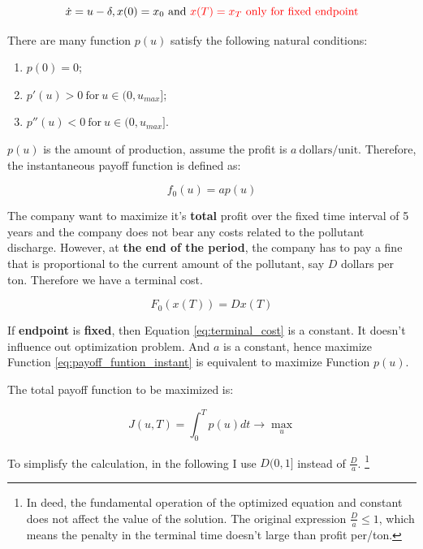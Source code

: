 \documentclass{article}
\begin{document}
\begin{equation}\label{cd:initial_condition}
    \dot{x}=u-\delta, x(0)=x_0\ \text{and}\ {\color{red} x(T)=x_T\ \text{only for fixed endpoint}}
\end{equation}

There are many function $p(u)$ satisfy the following natural conditions:

\begin{enumerate}
    \item $p(0)=0$;
    \item $p'(u)>0\ \text{for}\ u\in(0,u_{max}]$;
    \item $p''(u)<0\ \text{for}\ u\in(0,u_{max}]$.
\end{enumerate}

$p(u)$ is the amount of production, assume the profit is $a\ \text{dollars/unit}$. Therefore, the instantaneous payoff function is defined as:

\begin{equation}\label{eq:payoff_funtion_instant}
    f_0(u)=ap(u)
\end{equation}

The company want to maximize it's \textbf{total} profit over the fixed time interval of 5 years and the company does not bear any costs related to the pollutant discharge. However, at \textbf{the end of the period}, the company has to pay a fine that is proportional to the current amount of the pollutant, say $D$ dollars per ton. Therefore we have a terminal cost.

\begin{equation}\label{eq:terminal_cost}
    F_0(x(T))=Dx(T)
\end{equation}

If \textbf{endpoint} is \textbf{fixed}, then Equation \eqref{eq:terminal_cost} is a constant. It doesn't influence out optimization problem. And $a$ is a constant, hence maximize Function \eqref{eq:payoff_funtion_instant} is equivalent to maximize Function $p(u)$.


The total payoff function to be maximized  is:

\begin{equation}\label{eq:optfunction_without_terminal_cost}
    J(u,T)=\int_{0}^{T}p(u)dt\rightarrow \max_{u}
\end{equation}

To simplisfy the calculation, in the following I use $D(0,1]$ instead of $\frac{D}{a}$. \footnote{In deed, the fundamental operation of the optimized equation and constant does not affect the value of the solution. The original expression $\frac{D}{a}\leq 1$, which means the penalty in the terminal time doesn't large than profit per/ton.} 
\end{document}
